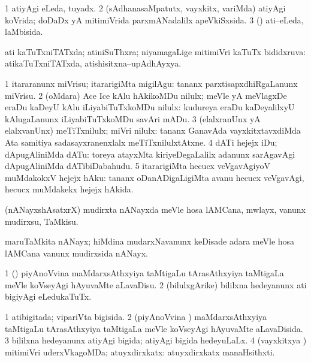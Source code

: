 \bentry
{}
\gl{\gu}
\bmng
\bnum
\num{1} atiyAgi eLeda, tuyadx. 
\num{2} (sAdhanasaMpatutx, vayxkitx, \mo variMda) atiyAgi koVrida; doDaDx yA mitimiVrida parxmANadalilx apeVkiSxsida. 
\num{3} (\rUpa) ati--eLeda, laMbisida. 
\enum
\emng
\eentry

\bentry
{}
\gl{\gu}
\bmng
ati kaTuTxniTATxda; atiniSuThxra; niyamagaLige mitimiVri kaTuTx bididxruva:  atikaTuTxniTATxda, atishisitxna--upAdhAyxya. 
\emng
\eentry

\bentry
{}
\gl{\sakirx}
\bmng
\bnum
\num{1} itararanunx miVrisu; itararigiMta migilAgu:  tananx parxtisapxdhiRgaLanunx miVrisu. 
\num{2} (oMdara) Ace Ice kAlu hAkikoMDu nilulx; meVle yA meVlagxDe eraDu kaDeyU kAlu iLiyabiTuTxkoMDu nilulx:  kudureya eraDu kaDeyalilxyU kAlugaLanunx iLiyabiTuTxkoMDu savAri mADu. 
\num{3} (elalxranUnx yA elalxvanUnx) meTiTxnilulx; miVri nilulx:  tananx GanavAda vayxkitxtavxdiMda Ata samitiya sadasayxranenxlalx meTiTxnilulxtAtxne.
\num{4} dATi hejejx iDu; dApugAliniMda dATu:  toreya atayxMta kiriyeDegaLalilx adanunx sarAgavAgi dApugAliniMda dATibiDabahudu. 
\num{5} itararigiMta hecucx veVgavAgiyoV muMdakokxV hejejx hAku:  tananx oDanADigaLigiMta avanu hecucx veVgavAgi, hecucx muMdakekx hejejx hAkida. 
\enum
\emng
\eentry

\bentry
{}
\gl{\sakirx}
\bmng
(nANayxshAsatxrX) mudirxta nANayxda meVle hosa lAMCana, mwlayx, \mo vanunx mudirxsu, TaMkisu. 
\emng
\eentry

\bentry
{}
\gl{\nA}
\bmng
maruTaMkita nANayx; hiMdina mudarxNavanunx keDisade adara meVle hosa lAMCana \mo vanunx mudirxsida nANayx. 
\emng
\eentry

\bentry
{}
\gl{\sakirx}
\bmng
\bnum
\num{1} (\saM) piyAnoVvina maMdarxsAthxyiya taMtigaLu tArasAthxyiya taMtigaLa meVle koVseyAgi hAyuvaMte aLavaDisu. 
\num{2} (bilulxgArike) bililxna hedeyanunx ati bigiyAgi eLedukaTuTx. 
\enum
\emng
\eentry

\bentry
{}
\gl{\gu}
\bmng
\bnum
\num{1} atibigitada; vipariVta bigisida. 
\num{2} (piyAnoVvina \vi) maMdarxsAthxyiya taMtigaLu tArasAthxyiya taMtigaLa meVle koVseyAgi hAyuvaMte aLavaDisida. 
\num{3} bililxna hedeyanunx atiyAgi bigida; atiyAgi bigida hedeyuLaLx. 
\num{4} (vayxkitxya \vi) mitimiVri uderxVkagoMDa; atuyxdirxkatx:  atuyxdirxkatx manaHsithxti. 
\enum
\emng
\eentry

